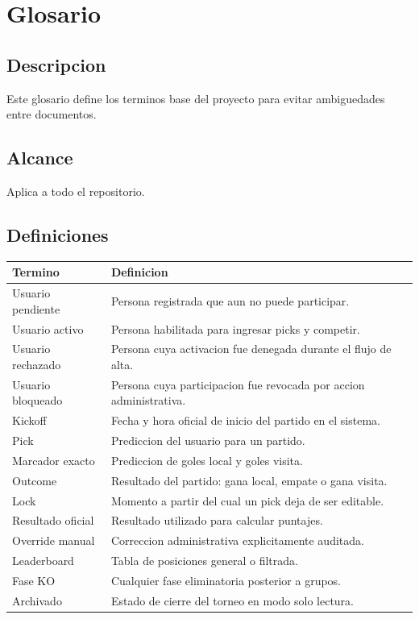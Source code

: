 \section{Glosario}

\subsection{Descripcion}

Este glosario define los terminos base del proyecto para evitar ambiguedades entre documentos.

\subsection{Alcance}

Aplica a todo el repositorio.

\subsection{Definiciones}

\begin{longtable}{p{}p{}}
\toprule
\textbf{Termino} & \textbf{Definicion} \\
\midrule
Usuario pendiente & Persona registrada que aun no puede participar. \\
Usuario activo & Persona habilitada para ingresar picks y competir. \\
Usuario rechazado & Persona cuya activacion fue denegada durante el flujo de alta. \\
Usuario bloqueado & Persona cuya participacion fue revocada por accion administrativa. \\
Kickoff & Fecha y hora oficial de inicio del partido en el sistema. \\
Pick & Prediccion del usuario para un partido. \\
Marcador exacto & Prediccion de goles local y goles visita. \\
Outcome & Resultado del partido: gana local, empate o gana visita. \\
Lock & Momento a partir del cual un pick deja de ser editable. \\
Resultado oficial & Resultado utilizado para calcular puntajes. \\
Override manual & Correccion administrativa explicitamente auditada. \\
Leaderboard & Tabla de posiciones general o filtrada. \\
Fase KO & Cualquier fase eliminatoria posterior a grupos. \\
Archivado & Estado de cierre del torneo en modo solo lectura. \\
\bottomrule
\end{longtable}

